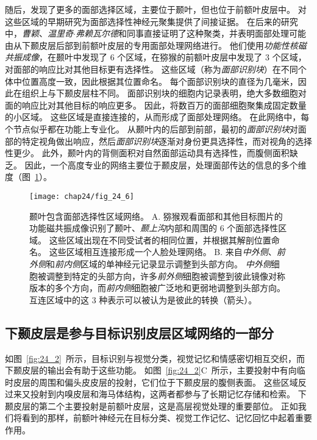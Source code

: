 随后，发现了更多的面部选择区域，主要位于颞叶，但也位于前额叶皮层中。
对这些区域的早期研究为面部选择性神经元聚集提供了间接证据。
在后来的研究中，\textit{曹颖}、\textit{温里奇$\cdot$弗赖瓦尔德}和同事直接证明了这种聚类，并表明面部处理可能由从下颞皮层后部到前额叶皮层的专用面部处理网络进行。
他们使用\textit{功能性核磁共振成像}，在颞叶中发现了 6 个区域，在猕猴的前额叶皮层中发现了 3 个区域，对面部的响应比对其他目标更有选择性。
这些区域（称为\textit{面部识别块}）在不同个体中位置高度一致，因此根据其位置命名。
每个面部识别块的直径为几毫米，因此在组织上与下颞皮层柱不同。
面部识别块的细胞内记录表明，绝大多数细胞对面的响应比对其他目标的响应更多。
因此，将数百万的面部细胞聚集成固定数量的小区域。
这些区域是直接连接的，从而形成了面部处理网络。
在此网络中，每个节点似乎都在功能上专业化。
从颞叶内的后部到前部，最初的\textit{面部识别块}对面部的特定视角做出响应，然后\textit{面部识别块}逐渐对身份更具选择性，而对视角的选择性更少。
此外，颞叶内的背侧面积对自然面部运动具有选择性，而腹侧面积缺乏。
因此，一个高度专业的网络主要位于颞皮层，处理面部传达的信息的多个维度（图~\ref{fig:24_6}）。


\begin{figure}[htbp]
	\centering
	\texttt{[image: chap24/fig\_24\_6]}
	\caption{颞叶包含面部选择性区域网络。
		A. 猕猴观看面部和其他目标图片的功能磁共振成像识别了颞叶、\textit{颞上沟}内部和周围的 6 个面部选择性区域。
		这些区域出现在不同受试者的相同位置，并根据其解剖位置命名。
		这些区域相互连接形成一个人脸处理网络。
		B. 来自\textit{中外侧}、\textit{前外侧}和\textit{前内侧}区域的单神经元记录显示调整到头部方向。
		\textit{中外侧}细胞被调整到特定的头部方向，许多\textit{前外侧}细胞被调整到彼此镜像对称版本的多个方向，而\textit{前内侧}细胞被广泛地和更弱地调整到头部方向。
		互连区域中的这 3 种表示可以被认为是彼此的转换（箭头）。}
	\label{fig:24_6}
\end{figure}



\subsection{下颞皮层是参与目标识别皮层区域网络的一部分}

如图~\ref{fig:24_2}~所示，目标识别与视觉分类，视觉记忆和情感密切相互交织，而下颞皮层的输出会有助于这些功能。
如图~\ref{fig:24_2}C~所示，主要投射中有向临时皮层的周围和偏头皮皮层的投射，它们位于下颞皮层的腹侧表面。
这些区域反过来又投射到内嗅皮层和海马体结构，这两者都参与了长期记忆存储和检索。
下颞皮层的第二个主要投射是前额叶皮层，这是高层视觉处理的重要部位。
正如我们将看到的那样，前额叶神经元在目标分类、视觉工作记忆、记忆回忆中起着重要作用。


